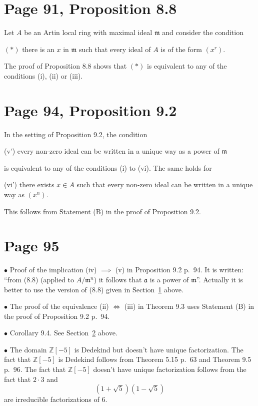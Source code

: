 \documentclass[12pt]{article}
\newcommand{\mf}{\mathfrak}
\newcommand{\bu}{\bullet}
\begin{document}
\section{Page 91, Proposition 8.8}\label{88}%

Let $A$ be an Artin local ring with maximal ideal $\mf m$ and consider the condition

$(*)$ there is an $x$ in $\mf m$ such that every ideal of $A$ is of the form $(x^r)$. 

The proof of Proposition 8.8 shows that $(*)$ is equivalent to any of the conditions (i), (ii) or (iii).

\section{Page 94, Proposition 9.2}\label{92}%

In the setting of Proposition 9.2, the condition

(v') every non-zero ideal can be written in a unique way as a power of $\mf m$

 is equivalent to any of the conditions (i) to (vi). The same holds for

(vi') there exists $x\in A$ such that every non-zero ideal can be written in a unique way as $(x^n)$.

This follows from Statement (B) in the proof of Proposition 9.2.

\section{Page 95}%

$\bu$ Proof of the implication (iv) $\implies$ (v) in Proposition 9.2 p.~94. It is written: ``from (8.8) (applied to $A/\mf m^n$) it follows that $\mf a$ is a power of $\mf m$''. Actually it is better to use the version of (8.8) given in Section~\ref{88} above.


$\bu$ The proof of the equivalence (ii) $\iff$ (iii) in Theorem 9.3 uses Statement (B) in the proof of Proposition 9.2 p.~94.

$\bu$ Corollary 9.4. See Section~\ref{92} above.

$\bu$ The domain $\mathbb Z[-5]$ is Dedekind but doesn't have unique factorization. The fact that $\mathbb Z[-5]$ is Dedekind follows from Theorem 5.15 p.~63 and Theorem 9.5 p.~96. The fact that $\mathbb Z[-5]$ doesn't have unique factorization follows from the fact that $2\cdot3$ and $$\left(1+\sqrt5\right)\left(1-\sqrt5\right)$$ are irreducible factorizations of $6$.%
\end{document}
